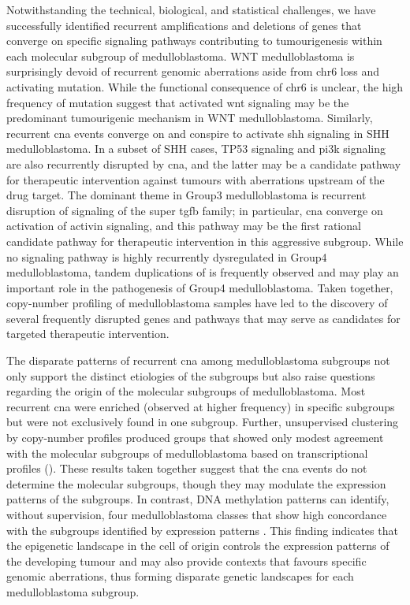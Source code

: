 Notwithstanding the technical, biological, and statistical challenges, we have successfully identified recurrent amplifications and deletions of genes that converge on specific signaling pathways contributing to tumourigenesis within each molecular subgroup of medulloblastoma. WNT medulloblastoma is surprisingly devoid of recurrent genomic aberrations aside from chr6 loss and  activating mutation. While the functional consequence of chr6 is unclear, the high frequency of  mutation suggest that activated \gls{wnt} signaling may be the predominant tumourigenic mechanism in WNT medulloblastoma. Similarly, recurrent \gls{cna} events converge on and conspire to activate \gls{shh} signaling in SHH medulloblastoma. In a subset of SHH cases, TP53 signaling and \gls{pi3k} signaling are also recurrently disrupted by \gls{cna}, and the latter may be a candidate pathway for therapeutic intervention against tumours with aberrations upstream of the drug target. The dominant theme in Group3 medulloblastoma is recurrent disruption of signaling of the super \gls{tgfb} family; in particular, \gls{cna} converge on activation of activin signaling, and this pathway may be the first rational candidate pathway for therapeutic intervention in this aggressive subgroup. While no signaling pathway is highly recurrently dysregulated in Group4 medulloblastoma, tandem duplications of  is frequently observed and may play an important role in the pathogenesis of Group4 medulloblastoma. Taken together, copy-number profiling of medulloblastoma samples have led to the discovery of several frequently disrupted genes and pathways that may serve as candidates for targeted therapeutic intervention.

The disparate patterns of recurrent \gls{cna} among medulloblastoma subgroups not only support the distinct etiologies of the subgroups but also raise questions regarding the origin of the molecular subgroups of medulloblastoma. Most recurrent \gls{cna} were enriched (observed at higher frequency) in specific subgroups but were not exclusively found in one subgroup. Further, unsupervised clustering by copy-number profiles produced groups that showed only modest agreement with the molecular subgroups of medulloblastoma based on transcriptional profiles (). These results taken together suggest that the \gls{cna} events do not determine the molecular subgroups, though they may modulate the expression patterns of the subgroups. In contrast, DNA methylation patterns can identify, without supervision, four medulloblastoma classes that show high concordance with the subgroups identified by expression patterns . This finding indicates that the epigenetic landscape in the cell of origin controls the expression patterns of the developing tumour and may also provide contexts that favours specific genomic aberrations, thus forming disparate genetic landscapes for each medulloblastoma subgroup.

